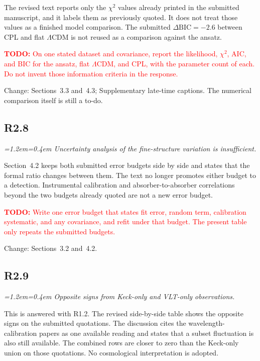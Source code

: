 \documentclass[11pt,a4paper]{article}
\newenvironment{review}{\par\color{revcolor}\itshape\leftskip=1.2em\rightskip=0.4em\noindent}{\par\leftskip=0pt\rightskip=0pt}
\newcommand{\revtodo}[1]{\textcolor{red}{\textbf{TODO:} #1}}
\begin{document}
The revised text reports only the $\chi^2$ values already printed in the submitted manuscript, and it labels them as previously quoted.
It does not treat those values as a finished model comparison.
The submitted $\Delta\mathrm{BIC} = -2.6$ between CPL and flat $\Lambda$CDM is not reused as a comparison against the ansatz.

\revtodo{On one stated dataset and covariance, report the likelihood, $\chi^2$, AIC, and BIC for the ansatz, flat $\Lambda$CDM, and CPL, with the parameter count of each. Do not invent those information criteria in the response.}

Change: Sections~3.3 and~4.3; Supplementary late-time captions. The numerical comparison itself is still a to-do.

\subsection*{R2.8}
\begin{review}
Uncertainty analysis of the fine-structure variation is insufficient.
\end{review}

Section~4.2 keeps both submitted error budgets side by side and states that the formal ratio changes between them.
The text no longer promotes either budget to a detection.
Instrumental calibration and absorber-to-absorber correlations beyond the two budgets already quoted are not a new error budget.

\revtodo{Write one error budget that states fit error, random term, calibration systematic, and any covariance, and refit under that budget. The present table only repeats the submitted budgets.}

Change: Sections~3.2 and~4.2.

\subsection*{R2.9}
\begin{review}
Opposite signs from Keck-only and VLT-only observations.
\end{review}

This is answered with R1.2.
The revised side-by-side table shows the opposite signs on the submitted quotations.
The discussion cites the wavelength-calibration papers as one available reading and states that a subset fluctuation is also still available.
The combined rows are closer to zero than the Keck-only union on those quotations.
No cosmological interpretation is adopted.
\end{document}
